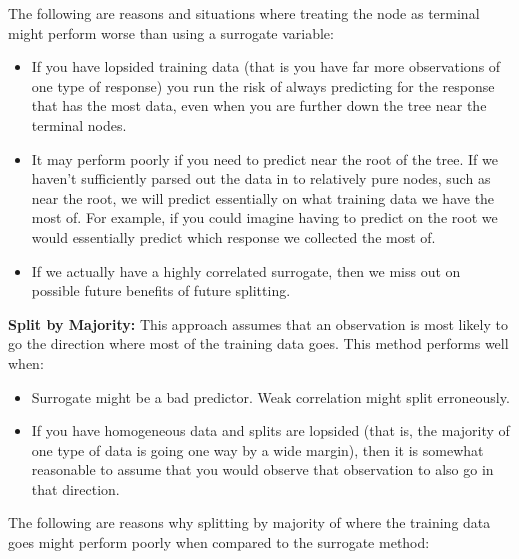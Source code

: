 \documentclass[11pt]{article}
\begin{document}
\vspace{2 mm}
\noindent
The following are reasons and situations where treating the node as terminal 
might perform worse than using a surrogate variable:

\begin{itemize}
\item If you have lopsided training data (that is you have far more 
observations of one type of response) you run the risk of always 
predicting for the response that has the most data, even when you are further 
down the tree near the terminal nodes.
\item It may perform poorly if you need to predict near the root of the tree. 
If we haven't sufficiently parsed out the data in to relatively pure nodes, 
such as near the root, we will predict essentially on what training data we 
have the most of. For example, if you could imagine having to predict on the 
root we would essentially predict which response we collected the most of.
\item If we actually have a highly correlated surrogate, then we miss out on 
possible future benefits of future splitting.
\end{itemize}

\vspace{2 mm}
\noindent
{\bf Split by Majority:} This approach assumes that an observation is most 
likely to go the direction where most of the training data goes. This method 
performs well when:

\begin{itemize}
\item Surrogate might be a bad predictor. Weak correlation might split 
erroneously.
\item If you have homogeneous data and splits are lopsided (that is, the 
majority of one type of data is going one way by a wide margin), then it is 
somewhat reasonable to assume that you would observe that observation to also 
go in that direction.
\end{itemize}

\vspace{2 mm}
\noindent
The following are reasons why splitting by majority of where the training data 
goes might perform poorly when compared to the surrogate method:
\end{document}
